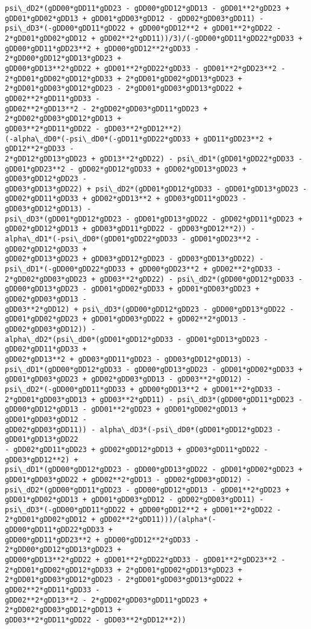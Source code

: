 \documentclass[landscape,letterpaper,10pt,english]{article}
\begin{document}
\begin{Verbatim}[commandchars=\\\{\}]
psi\_dD2*(gDD00*gDD11*gDD23 - gDD00*gDD12*gDD13 - gDD01**2*gDD23 +
gDD01*gDD02*gDD13 + gDD01*gDD03*gDD12 - gDD02*gDD03*gDD11) -
psi\_dD3*(-gDD00*gDD11*gDD22 + gDD00*gDD12**2 + gDD01**2*gDD22 -
2*gDD01*gDD02*gDD12 + gDD02**2*gDD11))/3)/(-gDD00*gDD11*gDD22*gDD33 +
gDD00*gDD11*gDD23**2 + gDD00*gDD12**2*gDD33 - 2*gDD00*gDD12*gDD13*gDD23 +
gDD00*gDD13**2*gDD22 + gDD01**2*gDD22*gDD33 - gDD01**2*gDD23**2 -
2*gDD01*gDD02*gDD12*gDD33 + 2*gDD01*gDD02*gDD13*gDD23 +
2*gDD01*gDD03*gDD12*gDD23 - 2*gDD01*gDD03*gDD13*gDD22 + gDD02**2*gDD11*gDD33 -
gDD02**2*gDD13**2 - 2*gDD02*gDD03*gDD11*gDD23 + 2*gDD02*gDD03*gDD12*gDD13 +
gDD03**2*gDD11*gDD22 - gDD03**2*gDD12**2)
(-alpha\_dD0*(-psi\_dD0*(-gDD11*gDD22*gDD33 + gDD11*gDD23**2 + gDD12**2*gDD33 -
2*gDD12*gDD13*gDD23 + gDD13**2*gDD22) - psi\_dD1*(gDD01*gDD22*gDD33 -
gDD01*gDD23**2 - gDD02*gDD12*gDD33 + gDD02*gDD13*gDD23 + gDD03*gDD12*gDD23 -
gDD03*gDD13*gDD22) + psi\_dD2*(gDD01*gDD12*gDD33 - gDD01*gDD13*gDD23 -
gDD02*gDD11*gDD33 + gDD02*gDD13**2 + gDD03*gDD11*gDD23 - gDD03*gDD12*gDD13) -
psi\_dD3*(gDD01*gDD12*gDD23 - gDD01*gDD13*gDD22 - gDD02*gDD11*gDD23 +
gDD02*gDD12*gDD13 + gDD03*gDD11*gDD22 - gDD03*gDD12**2)) -
alpha\_dD1*(-psi\_dD0*(gDD01*gDD22*gDD33 - gDD01*gDD23**2 - gDD02*gDD12*gDD33 +
gDD02*gDD13*gDD23 + gDD03*gDD12*gDD23 - gDD03*gDD13*gDD22) -
psi\_dD1*(-gDD00*gDD22*gDD33 + gDD00*gDD23**2 + gDD02**2*gDD33 -
2*gDD02*gDD03*gDD23 + gDD03**2*gDD22) - psi\_dD2*(gDD00*gDD12*gDD33 -
gDD00*gDD13*gDD23 - gDD01*gDD02*gDD33 + gDD01*gDD03*gDD23 + gDD02*gDD03*gDD13 -
gDD03**2*gDD12) + psi\_dD3*(gDD00*gDD12*gDD23 - gDD00*gDD13*gDD22 -
gDD01*gDD02*gDD23 + gDD01*gDD03*gDD22 + gDD02**2*gDD13 - gDD02*gDD03*gDD12)) -
alpha\_dD2*(psi\_dD0*(gDD01*gDD12*gDD33 - gDD01*gDD13*gDD23 - gDD02*gDD11*gDD33 +
gDD02*gDD13**2 + gDD03*gDD11*gDD23 - gDD03*gDD12*gDD13) -
psi\_dD1*(gDD00*gDD12*gDD33 - gDD00*gDD13*gDD23 - gDD01*gDD02*gDD33 +
gDD01*gDD03*gDD23 + gDD02*gDD03*gDD13 - gDD03**2*gDD12) -
psi\_dD2*(-gDD00*gDD11*gDD33 + gDD00*gDD13**2 + gDD01**2*gDD33 -
2*gDD01*gDD03*gDD13 + gDD03**2*gDD11) - psi\_dD3*(gDD00*gDD11*gDD23 -
gDD00*gDD12*gDD13 - gDD01**2*gDD23 + gDD01*gDD02*gDD13 + gDD01*gDD03*gDD12 -
gDD02*gDD03*gDD11)) - alpha\_dD3*(-psi\_dD0*(gDD01*gDD12*gDD23 - gDD01*gDD13*gDD22
- gDD02*gDD11*gDD23 + gDD02*gDD12*gDD13 + gDD03*gDD11*gDD22 - gDD03*gDD12**2) +
psi\_dD1*(gDD00*gDD12*gDD23 - gDD00*gDD13*gDD22 - gDD01*gDD02*gDD23 +
gDD01*gDD03*gDD22 + gDD02**2*gDD13 - gDD02*gDD03*gDD12) -
psi\_dD2*(gDD00*gDD11*gDD23 - gDD00*gDD12*gDD13 - gDD01**2*gDD23 +
gDD01*gDD02*gDD13 + gDD01*gDD03*gDD12 - gDD02*gDD03*gDD11) -
psi\_dD3*(-gDD00*gDD11*gDD22 + gDD00*gDD12**2 + gDD01**2*gDD22 -
2*gDD01*gDD02*gDD12 + gDD02**2*gDD11)))/(alpha*(-gDD00*gDD11*gDD22*gDD33 +
gDD00*gDD11*gDD23**2 + gDD00*gDD12**2*gDD33 - 2*gDD00*gDD12*gDD13*gDD23 +
gDD00*gDD13**2*gDD22 + gDD01**2*gDD22*gDD33 - gDD01**2*gDD23**2 -
2*gDD01*gDD02*gDD12*gDD33 + 2*gDD01*gDD02*gDD13*gDD23 +
2*gDD01*gDD03*gDD12*gDD23 - 2*gDD01*gDD03*gDD13*gDD22 + gDD02**2*gDD11*gDD33 -
gDD02**2*gDD13**2 - 2*gDD02*gDD03*gDD11*gDD23 + 2*gDD02*gDD03*gDD12*gDD13 +
gDD03**2*gDD11*gDD22 - gDD03**2*gDD12**2))
    \end{Verbatim}
\end{document}
